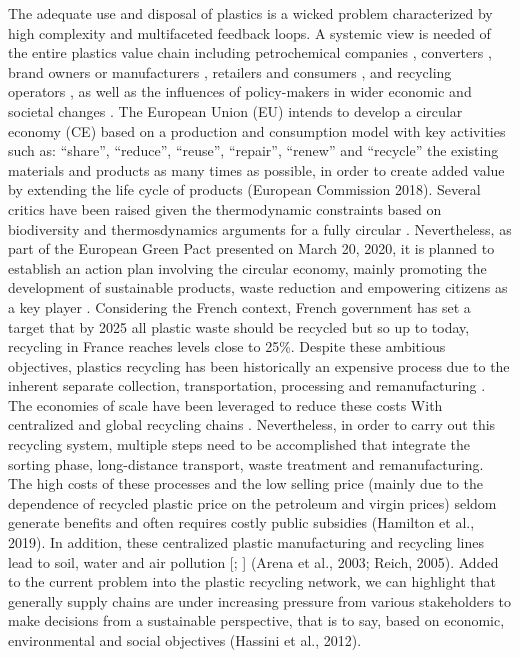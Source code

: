 \documentclass[]{elsarticle} %
\begin{document}
The adequate use and disposal of plastics is a wicked problem characterized by high complexity and multifaceted feedback loops.
A systemic view is needed of the entire plastics value chain including petrochemical companies \citep{Iles2013, DeVargasMores2018}, converters \citep{Paletta2019}, brand owners or manufacturers \citep{Gong2020, Ma2020}, retailers and consumers \citep{Confente2020, Friedrich2020, Filho2021}, and recycling operators \citep{Huysveld2019, Pazienza2020}, as well as the influences of policy-makers in wider economic and societal changes \citep{Paletta2019}.
The European Union (EU) intends to develop a circular economy (CE) based on a production and consumption model with key activities such as: ``share'', ``reduce'', ``reuse'', ``repair'', ``renew'' and ``recycle'' the existing materials and products as many times as possible, in order to create added value by extending the life cycle of products (European Commission 2018).
Several critics have been raised given the thermodynamic constraints based on biodiversity and thermosdynamics arguments for a fully circular \citep{corvellec2021, Giampietro2020}.
Nevertheless, as part of the European Green Pact presented on March 20, 2020, it is planned to establish an action plan involving the circular economy, mainly promoting the development of sustainable products, waste reduction and empowering citizens as a key player \citep{EC2018}.
Considering the French context, French government has set a target that by 2025 all plastic waste should be recycled but so up to today, recycling in France reaches levels close to 25\%.
Despite these ambitious objectives, plastics recycling has been historically an expensive process due to the inherent separate collection, transportation, processing and remanufacturing \citep{Hopewell2009, Singh2017b}.
The economies of scale have been leveraged to reduce these costs With centralized and global recycling chains \citep{Anzalone2013, Kreiger2013}.
Nevertheless, in order to carry out this recycling system, multiple steps need to be accomplished that integrate the sorting phase, long-distance transport, waste treatment and remanufacturing.
The high costs of these processes and the low selling price (mainly due to the dependence of recycled plastic price on the petroleum and virgin prices) seldom generate benefits and often requires costly public subsidies (Hamilton et al., 2019).
In addition, these centralized plastic manufacturing and recycling lines lead to soil, water and air pollution {[}\citet{Arena2003}; {]} (Arena et al., 2003; Reich, 2005).
Added to the current problem into the plastic recycling network, we can highlight that generally supply chains are under increasing pressure from various stakeholders to make decisions from a sustainable perspective, that is to say, based on economic, environmental and social objectives (Hassini et al., 2012).
\end{document}
